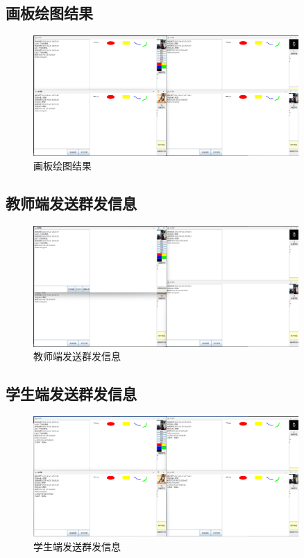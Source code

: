 \documentclass[UTF8,12pt]{article}
\begin{document}
\subsection{画板绘图结果}
\begin{figure}[htbp]
    \centering
    \includegraphics[width=0.9\textwidth]{img/33.png}
    \caption{画板绘图结果}
\end{figure}

\subsection{教师端发送群发信息}
\begin{figure}[htbp]
    \centering
    \includegraphics[width=0.9\textwidth]{img/34.png}
    \caption{教师端发送群发信息}
\end{figure}

\newpage

\subsection{学生端发送群发信息}
\begin{figure}[htbp]
    \centering
    \includegraphics[width=0.9\textwidth]{img/35.png}
    \caption{学生端发送群发信息}
\end{figure}
\end{document}
